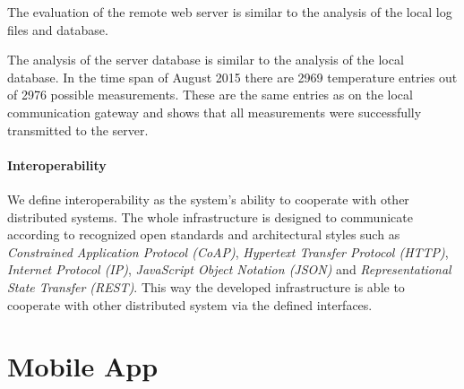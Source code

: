 The evaluation of the remote web server is similar to the analysis of the local log files and database.




The analysis of the server database is similar to the analysis of the local database.
In the time span of August 2015 there are 2969 temperature entries out of 2976 possible measurements.
These are the same entries as on the local communication gateway and shows that all measurements were successfully transmitted to the server.








\paragraph{Interoperability}

We define interoperability as the system's ability to cooperate with other distributed systems.
The whole infrastructure is designed to communicate according to recognized open standards and architectural styles such as \emph{Constrained Application Protocol (CoAP)}, \emph{Hypertext Transfer Protocol (HTTP)}, \emph{Internet Protocol (IP)}, \emph{JavaScript Object Notation (JSON)} and \emph{Representational State Transfer (REST)}.
This way the developed infrastructure is able to cooperate with other distributed system via the defined interfaces.










\section{Mobile App}
